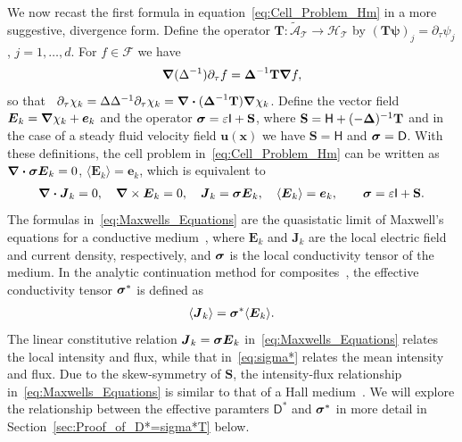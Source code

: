 \documentclass[leqno,onefignum,onetabnum]{siamltex1213}
\newcommand{\secref}[1]{Section~\ref{#1}}
\newcommand{\Tb}{\mathbf{T}}
\newcommand{\Sb}{\mathbf{S}}
\newcommand{\Tc}{\mathcal{T}}
\newcommand{\Hc}{\mathcal{H}}
\newcommand{\Ac}{\mathcal{A}}
\newcommand{\Dm}{\mathsf{D}}
\newcommand{\Hm}{\mathsf{H}}
\newcommand{\Ib}{\mathsf{I}}
\newcommand{\Fs}{\mathscr{F}}
\newcommand\bsig{\mbox{\boldmath${\sigma}$}}
\newcommand\bDelta{\mbox{\boldmath${\Delta}$}}
\newcommand\bnabla{\mbox{\boldmath${\nabla}$}}
\providecommand\bcdot{\boldsymbol{\cdot}}
\newcommand{\vecJ}{\boldsymbol{J}}
\newcommand{\vecE}{\boldsymbol{E}}
\newcommand{\vecx}{\boldsymbol{x}}
\newcommand{\vecu}{\boldsymbol{u}}
\newcommand{\vece}{\boldsymbol{e}}
\newcommand{\vecpsi}{\boldsymbol{\psi}}
\begin{document}
We now recast the first formula in equation~\eqref{eq:Cell_Problem_Hm}
in a more suggestive, divergence form. Define the operator
$\Tb:\tilde{\Ac}_{\Tc}\to\Hc_{\Tc}$ by $(\Tb\vecpsi)_j=\partial_\tau\psi_j$,
$j=1,\ldots,d$. For $f\in\Fs$ we
have~\cite{Fannjiang:1994:SIAM_JAM:333,Folland:99:RealAnalysis}     
%
\begin{align}\label{eq:Dt_T}
  \bnabla(\Delta^{-1})\partial_\tau f=\bDelta^{-1}\Tb\bnabla f ,
\end{align}
%
so that~\cite{Fannjiang:1994:SIAM_JAM:333}
$\partial_\tau\chi_k=\Delta\Delta^{-1}\partial_\tau\chi_k=\bnabla \bcdot(\bDelta^{-1}\Tb)\bnabla \chi_k$. Define the  
vector field $\vecE_k=\bnabla \chi_k+\vece_k$ and the operator
$\bsig=\varepsilon\Ib+\Sb$, where
$\Sb=\Hm+(-\bDelta)^{-1}\Tb$ and in the case of a steady fluid velocity
field $\vecu(\vecx)$ we have $\Sb=\Hm$ and $\bsig=\Dm$. With these
definitions, the cell problem in~\eqref{eq:Cell_Problem_Hm} can be
written as $\bnabla\bcdot\bsig\vecE_k=0$, $\langle\vecE_k\rangle=\vece_k$, which
is equivalent to     
%
\begin{align}\label{eq:Maxwells_Equations}    
  \bnabla \bcdot\vecJ_k=0, \quad
  \bnabla \times\vecE_k=0, \quad
  \vecJ_k=\bsig\vecE_k,\quad
  \langle\vecE_k\rangle=\vece _k,\qquad
  \bsig%
       =\varepsilon\Ib+\Sb.
\end{align}
%
The formulas in~\eqref{eq:Maxwells_Equations} are the
quasistatic limit of Maxwell's equations for a conductive
medium~\cite{Golden:CMP-473,MILTON:2002:TC}, where $\vecE_k$ and
$\vecJ_k$ are the local electric field and current density,
respectively, and $\bsig$ is the local conductivity tensor of the
medium. In the analytic continuation method for
composites~\cite{Golden:CMP-473}, the effective conductivity tensor
$\bsig^*$ is defined as 
% 
\begin{align}\label{eq:sigma*}
  \langle\vecJ_k\rangle=\bsig^*\langle\vecE_k\rangle.
\end{align}
%
The linear constitutive relation $\vecJ_k=\bsig\vecE_k$
in~\eqref{eq:Maxwells_Equations} relates the local intensity and flux, 
while that in~\eqref{eq:sigma*} relates the mean intensity and
flux. Due to the skew-symmetry of $\Sb$, the intensity-flux
relationship in~\eqref{eq:Maxwells_Equations} is similar to that of a
Hall
medium~\cite{Isichenko:JNS:1991:375,Fannjiang:1994:SIAM_JAM:333}. We 
will explore the relationship between the effective paramters $\Dm^*$
and $\bsig^*$ in more detail in \secref{sec:Proof_of_D*=sigma*T} below.
\end{document}
